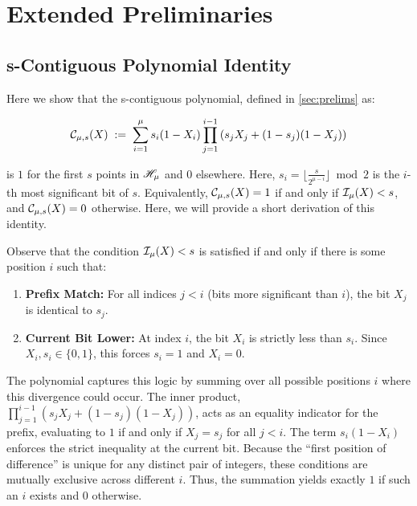 \doclearpage
\section{Extended Preliminaries}
\label{sec:extended_preliminaries}


\subsection{s-Contiguous Polynomial Identity}
\label{sec:contigmus-derivation}

Here we show that the s-contiguous polynomial, defined in \cref{sec:prelims} as:

$$\mathcal{C}_{\mu, s}(X) \;:=\; \sum_{i=1}^{\mu} s_i(1 - X_i) \prod_{j=1}^{i-1} \left(s_jX_j + (1 - s_j)(1 - X_j)\right)$$

is $1$ for the first $s$ points in $\mathscr{H}_{\mu}$ and $0$ elsewhere. Here, $s_i = \lfloor \frac{s}{2^{\mu - i}} \rfloor \bmod 2$ is the $i$-th most significant bit of $s$.  Equivalently, $\mathcal{C}_{\mu, s}(X) = 1$ if and only if $\mathcal{I}_\mu(X) < s$, and $\mathcal{C}_{\mu, s}(X) = 0$ otherwise. Here, we will provide a short derivation of this identity.

Observe that the condition $\mathcal{I}_\mu(X) < s$ is satisfied if and only if there is some position $i$ such that:
\begin{enumerate}[nosep]
    \item \textbf{Prefix Match:} For all indices $j < i$ (bits more significant than $i$), the bit $X_j$ is identical to $s_j$.
    \item \textbf{Current Bit Lower:} At index $i$, the bit $X_i$ is strictly less than $s_i$. Since $X_i, s_i \in \{0,1\}$, this forces $s_i = 1$ and $X_i = 0$.
\end{enumerate}

The polynomial captures this logic by summing over all possible positions $i$ where this divergence could occur. The inner product, $\prod_{j=1}^{i-1} (s_jX_j + (1 - s_j)(1 - X_j))$, acts as an equality indicator for the prefix, evaluating to $1$ if and only if $X_j = s_j$ for all $j < i$. The term $s_i(1 - X_i)$ enforces the strict inequality at the current bit. Because the ``first position of difference'' is unique for any distinct pair of integers, these conditions are mutually exclusive across different $i$. Thus, the summation yields exactly $1$ if such an $i$ exists and $0$ otherwise.


